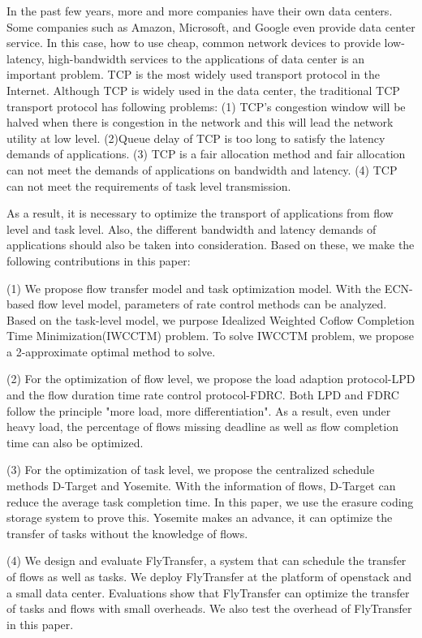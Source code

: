 \begin{eabstract}
In the past few years, more and more companies have their own data centers.
Some companies such as Amazon, Microsoft, and Google even provide data center service. 
In this case, how to use cheap, common network devices to provide low-latency, high-bandwidth services to the applications of data center is an important problem. TCP is the most widely used transport protocol in the Internet. 
Although TCP is widely used in the data center, 
the traditional TCP transport protocol has following problems:
 (1) TCP's congestion window will be halved when there is congestion in the network
 and this will lead the network utility at low level.
 (2)Queue delay of TCP is too long to satisfy the latency demands of applications. 
 (3) TCP is a fair allocation method and fair allocation can not meet the demands of applications on bandwidth and latency. 
 (4) TCP can not meet the requirements of task level transmission.
 
As a result, it is necessary to optimize the transport of applications from flow level and task level.
Also, the different bandwidth and latency demands of applications should also be taken into consideration.
Based on these, we make the following contributions in this paper:
 
(1) We propose flow transfer model and task optimization model. 
With the ECN-based flow level model, parameters of rate control methods can be analyzed.
Based on the task-level model, we purpose Idealized Weighted Coflow Completion Time Minimization(IWCCTM) problem.
To solve IWCCTM problem, we propose a 2-approximate optimal method to solve.
  
(2) For the optimization of flow level, 
we propose the load adaption protocol-LPD and the flow duration time rate control protocol-FDRC.
Both LPD and FDRC follow the principle "more load, more differentiation".
As a result, even under heavy load, 
the percentage of flows missing deadline as well as flow completion time can also be optimized.
 
 
(3) For the optimization of task level,
we propose the centralized schedule methods D-Target and Yosemite.
With the information of flows, D-Target can reduce the average task completion time.
In this paper, we use the erasure coding storage system to prove this.
Yosemite makes an advance, it can optimize the transfer of tasks without the knowledge of flows.  
 
 

(4) We design and evaluate FlyTransfer, a system that can schedule the transfer of flows as well as tasks. 
We deploy FlyTransfer at the platform of openstack and a small data center.
Evaluations show that FlyTransfer can optimize the transfer of tasks and flows with small overheads.
We also test the overhead of FlyTransfer in this paper.
  
  
\end{eabstract}

